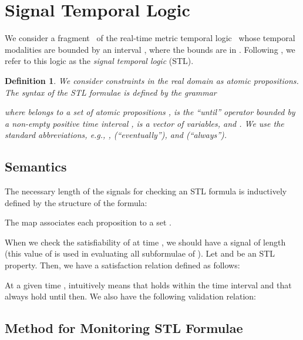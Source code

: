 \documentclass[paper]{ieice}
\newtheorem{definition}{Definition}
\begin{document}
\section{Signal Temporal Logic}
\label{s:stl}

We consider a fragment~\cite{Maler2003} of the real-time metric temporal logic~\cite{Alur1996} whose temporal modalities are bounded by an interval , where the bounds  are in .
Following \cite{Maler2003}, we refer to this logic as the \emph{signal temporal logic} (STL).

\begin{definition}
We consider constraints in the real domain as atomic propositions.
The syntax of the STL formulae is defined by the grammar

where  belongs to a set of \emph{atomic propositions} ,  is the ``until'' operator bounded by a non-empty positive time interval , 
 is a vector of variables, and .
We use the standard abbreviations, e.g., ,  (``eventually''), and  (``always'').
\end{definition}


\subsection{Semantics}

The necessary length  of the signals for checking an STL formula  is inductively defined by the structure of the formula:

The map  associates each proposition  to a set .

When we check the satisfiability of  at time , we should have a signal of length  (this value of  is used in evaluating all subformulae of ).
Let  and  be an STL property.
Then, we have a satisfaction relation defined as follows:

At a given time ,  intuitively means that  holds within the time interval  and that  always hold until then.
We also have the following validation relation:



\subsection{Method for Monitoring STL Formulae}
\label{s:stl:monitoring}
\end{document}
